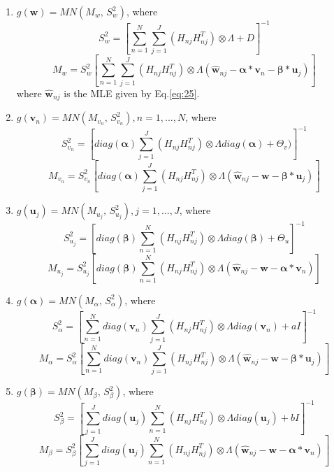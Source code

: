 \documentclass[12pt]{elsarticle}
\begin{document}
		\begin{enumerate}
			
			\item  $g\left(\boldsymbol{w}\right)=MN\left(M_{w},\, S_{w}^{2}\right)$, where
			\[S_{w}^{2}=\left[ \sum_{n=1}^{N} \sum_{j=1}^{J} \left(H_{nj}H_{nj}^{T}\right) \otimes \Lambda + D \right]^{-1}\]
			\[M_{w} = S_{w}^{2} \left[ \sum_{n=1}^{N} \sum_{j=1}^{J} \left( H_{nj}H_{nj}^{T} \right) \otimes \Lambda \left( \hat{\boldsymbol{w}}_{nj} - \boldsymbol{\alpha} * \boldsymbol{v}_{n} - \boldsymbol{\beta} * \boldsymbol{u}_{j} \right) \right] \]
			where $\hat{\boldsymbol{w}}_{nj}$ is the MLE given by Eq.\ref{eq:25}.
			
			\item $g\left(\boldsymbol{v}_{n}\right)=MN\left(M_{v_{n}},\, S_{v_{n}}^{2}\right), n=1,...,N$, where
			\[S_{v_{n}}^{2}=\left[diag(\boldsymbol{\alpha})\sum_{j=1}^{J} \left(H_{nj}H_{nj}^{T}\right) \otimes \Lambda diag(\boldsymbol{\alpha})+\Theta_{v})\right]^{-1}\]
			\[
			M_{v_{n}} = S_{v_{n}}^{2} \left[diag(\boldsymbol{\alpha}) \sum_{j=1}^{J} \left(H_{nj}H_{nj}^{T}\right) \otimes \Lambda \left(\hat{\boldsymbol{w}}_{nj} - \boldsymbol{w} - \boldsymbol{\beta}*\boldsymbol{u}_{j}\right)\right]
			\]
			
			\item $g\left(\boldsymbol{u}_{j}\right)=MN\left(M_{u_{j}},\, S_{u_{j}}^{2}\right), j=1,...,J$, where
			\[
			S_{u_{j}}^{2} = \left[diag(\boldsymbol{\beta}) \sum_{n=1}^{N} \left(H_{nj}H_{nj}^{T}\right) \otimes \Lambda  diag(\boldsymbol{\beta}) + \Theta_{u} \right]^{-1}
			\]
			\[
			M_{u_{j}} = S_{u_{j}}^{2} \left[ diag(\boldsymbol{\beta}) \sum_{n=1}^{N}\left(H_{nj}H_{nj}^{T} \right) \otimes \Lambda \left(\hat{\boldsymbol{w}}_{nj} - \boldsymbol{w} - \boldsymbol{\alpha} * \boldsymbol{v}_{n} \right)\right]
			\]
			
			
			\item $g\left(\boldsymbol{\alpha}\right)=MN\left(M_{\alpha},\, S_{\alpha}^{2}\right)$, where
			\[
			S_{\alpha}^{2} = \left[ \sum_{n=1}^{N} diag(\boldsymbol{v}_{n}) \sum_{j=1}^{J} \left(H_{nj}H_{nj}^{T}\right) \otimes \Lambda  diag(\boldsymbol{v}_{n}) + aI\right]^{-1}
			\]
			\[
			M_{\alpha} = S_{\alpha}^{2} \left[\sum_{n=1}^{N} diag(\boldsymbol{v}_{n}) \sum_{j=1}^{J} \left(H_{nj}H_{nj}^{T}\right) \otimes \Lambda \left(\hat{\boldsymbol{w}}_{nj} - \boldsymbol{w} - \boldsymbol{\beta} * \boldsymbol{u}_{j} \right)\right]
			\]
			
			
			\item $g\left(\boldsymbol{\beta}\right)=MN\left(M_{\beta},\, S_{\beta}^{2}\right)$, where
			\[ 
			S_{\beta}^{2} = \left[\sum_{j=1}^{J} diag(\boldsymbol{u}_{j}) \sum_{n=1}^{N} \left(H_{nj}H_{nj}^{T}\right) \otimes \Lambda  diag(\boldsymbol{u}_{j})+bI\right]^{-1}
			\]
			\[
			M_{\beta} = S_{\beta}^{2} \left[ \sum_{j=1}^{J} diag(\boldsymbol{u}_{j}) \sum_{n=1}^{N} \left(H_{nj}H_{nj}^{T}\right) \otimes \Lambda \left(\hat{\boldsymbol{w}}_{nj} - \boldsymbol{w} - \boldsymbol{\alpha} * \boldsymbol{v}_{n} \right)\right]
			\]
			

\end{enumerate}
\end{document}
